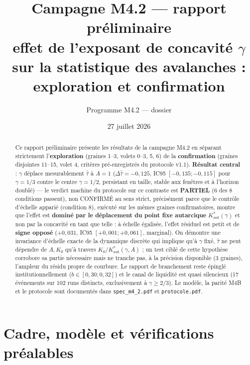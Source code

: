 \documentclass[11pt,a4paper]{article}
\title{Campagne M4.2 --- rapport préliminaire\\
\large effet de l'exposant de concavité $\gamma$ sur la statistique des
avalanches : exploration et confirmation}
\author{Programme M4.2 --- dossier \code{m4\_2\_credit\_soc}}
\date{27 juillet 2026}
\newcommand{\code}[1]{\texttt{#1}}
\begin{document}
\maketitle

\begin{abstract}
Ce rapport préliminaire présente les résultats de la campagne M4.2 en
séparant strictement l'\textbf{exploration} (graines 1--3, volets 0--3,
5, 6) de la \textbf{confirmation} (graines disjointes 11--15, volet 4,
critères pré-enregistrés du protocole v1.1). \textbf{Résultat central} :
$\gamma$ déplace mesurablement $\hat\tau$ à $A=1$
($\Delta\hat\tau=-0{,}125$, IC95 $[-0{,}135;-0{,}115]$ pour
$\gamma=1/3$ contre le centre $\gamma=1/2$, persistant en taille, stable
aux fenêtres et à l'horizon doublé) --- le verdict machine du protocole
sur ce contraste est \textbf{PARTIEL} (6 des 8 conditions passent), non
CONFIRMÉ au sens strict, précisément parce que le contrôle d'échelle
apparié (condition 8), exécuté sur les mêmes graines confirmatoires,
montre que l'effet est \textbf{dominé par le déplacement du point fixe
autarcique} $K^*_{\mathrm{aut}}(\gamma)$ et non par la concavité en tant
que telle : à échelle égalisée, l'effet résiduel est petit et de
\textbf{signe opposé} ($+0{,}031$, IC95 $[+0{,}001;+0{,}061]$, marginal).
On démontre une invariance d'échelle exacte de la dynamique discrète qui
implique qu'à $\gamma$ fixé, $\hat\tau$ ne peut dépendre de $A,K_0$ qu'à
travers $K_0/K^*_{\mathrm{aut}}(\gamma,A)$ ; un test ciblé de cette
hypothèse corrobore sa partie nécessaire mais ne tranche pas, à la
précision disponible (3 graines), l'ampleur du résidu propre de
courbure. Le rapport de branchement reste épinglé institutionnellement
($b\in[0{,}30;0{,}32]$) et le canal de liquidité est quasi silencieux
(17 événements sur 102 runs distincts, exclusivement à $\gamma\ge2/3$).
Le modèle, la parité M4B et le protocole sont documentés dans
\code{spec\_m4\_2.pdf} et \code{protocole.pdf}.
\end{abstract}

\tableofcontents

\section{Cadre, modèle et vérifications préalables}
\end{document}
